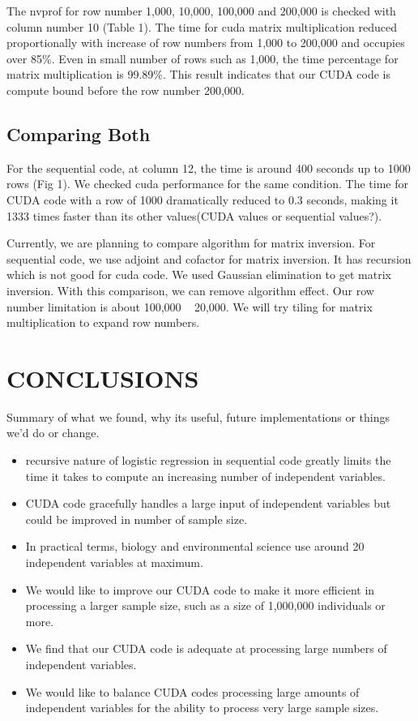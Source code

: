 \documentclass[letterpaper, 10 pt, conference]{ieeeconf}  %
\begin{document}
The nvprof for row number 1,000, 10,000, 100,000 and 200,000 is checked with column number 10 (Table 1).  The time for cuda matrix multiplication reduced proportionally with increase of row numbers from 1,000 to 200,000 and occupies over 85\%. Even in small number of rows such as 1,000, the time percentage for matrix multiplication is 99.89\%. This result indicates that our CUDA code is compute bound before the row number 200,000. 


\subsection{Comparing Both}

For the sequential code, at column 12, the time is around 400 seconds up to 1000 rows (Fig 1). We checked cuda performance for the same condition. The time for CUDA code with a row of 1000 dramatically reduced to 0.3 seconds, making it 1333 times faster than its other values(CUDA values or sequential values?). 

Currently, we are planning to compare algorithm for matrix inversion. For sequential code, we use adjoint and cofactor for matrix inversion. It has recursion which is not good for cuda code. We used Gaussian elimination to get matrix inversion. With this comparison, we can remove algorithm effect. Our row number limitation is about 100,000 ~ 20,000. We will try tiling for matrix multiplication to expand row numbers.  


\section{CONCLUSIONS}

Summary of what we found, why its useful, future implementations or things we'd do or change.

\begin{itemize}

\item recursive nature of logistic regression in sequential code greatly limits the time it takes to compute an increasing number of independent variables. 
\item CUDA code gracefully handles a large input of independent variables but could be improved in number of sample size.
\item In practical terms, biology and environmental science use around 20 independent variables at maximum.
\item We would like to improve our CUDA code to make it more efficient in processing a larger sample size, such as a size of 1,000,000 individuals or more.
\item We find that our CUDA code is adequate at processing large numbers of independent variables.
\item We would like to balance CUDA codes processing large amounts of independent variables for the ability to process very large sample sizes.
\end{itemize}
\end{document}
